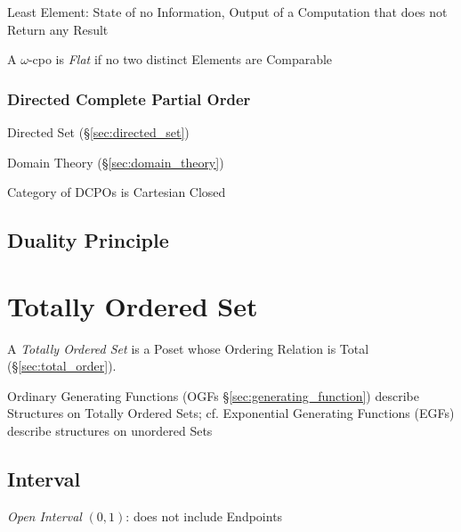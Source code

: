 Least Element: State of no Information, Output of a Computation that
does not Return any Result

A $\omega$-cpo is \emph{Flat} if no two distinct Elements are
Comparable



\subsubsection{Directed Complete Partial Order}\label{sec:dcpo}

Directed Set (\S\ref{sec:directed_set})

Domain Theory (\S\ref{sec:domain_theory})

Category of DCPOs is Cartesian Closed



\subsection{Duality Principle}\label{sec:duality_principle}



\section{Totally Ordered Set}\label{sec:totally_ordered}

A \emph{Totally Ordered Set} is a Poset whose Ordering Relation is
Total (\S\ref{sec:total_order}).

\fist Ordinary Generating Functions (OGFs \S\ref{sec:generating_function})
describe Structures on Totally Ordered Sets; cf. Exponential Generating
Functions (EGFs) describe structures on unordered Sets



\subsection{Interval}\label{sec:interval}

\emph{Open Interval} $(0,1)$: does not include Endpoints

